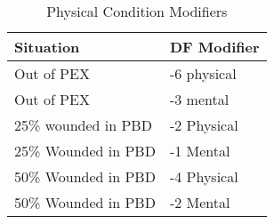 \begin{table}[h]
	\begin{tabular}{ll}
	Situation			& DF Modifier	\\ 
	\hline
	Out of PEX			& -6 physical	\\
	Out of PEX			& -3 mental		\\
	25\% wounded in PBD & -2 Physical	\\
	25\% Wounded in PBD & -1 Mental		\\
	50\% Wounded in PBD & -4 Physical	\\
	50\% Wounded in PBD & -2 Mental		\\ 
    \end{tabular}
    \caption{Physical Condition Modifiers}
\end{table}


